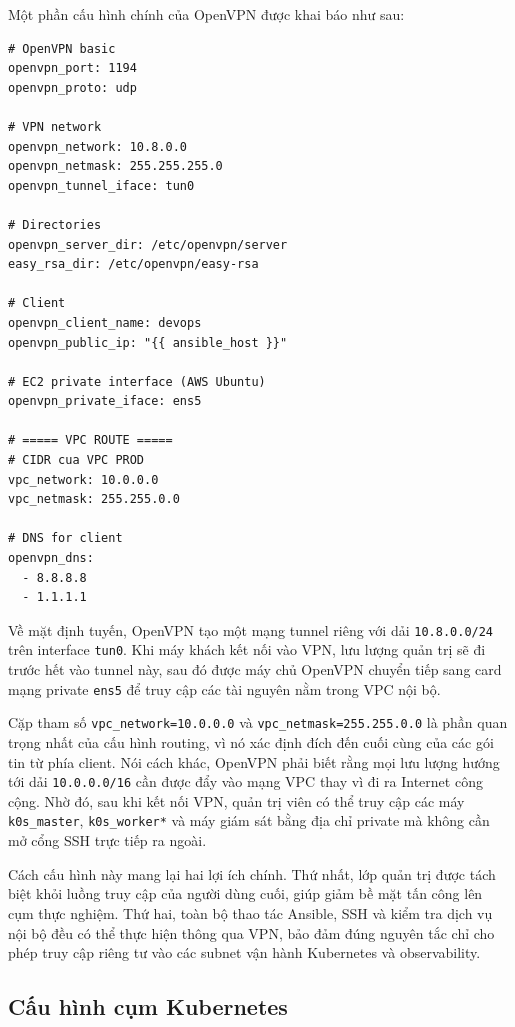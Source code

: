 Một phần cấu hình chính của OpenVPN được khai báo như sau:

\begin{lstlisting}
# OpenVPN basic
openvpn_port: 1194
openvpn_proto: udp

# VPN network
openvpn_network: 10.8.0.0
openvpn_netmask: 255.255.255.0
openvpn_tunnel_iface: tun0

# Directories
openvpn_server_dir: /etc/openvpn/server
easy_rsa_dir: /etc/openvpn/easy-rsa

# Client
openvpn_client_name: devops
openvpn_public_ip: "{{ ansible_host }}"

# EC2 private interface (AWS Ubuntu)
openvpn_private_iface: ens5

# ===== VPC ROUTE =====
# CIDR cua VPC PROD
vpc_network: 10.0.0.0
vpc_netmask: 255.255.0.0

# DNS for client
openvpn_dns:
  - 8.8.8.8
  - 1.1.1.1
\end{lstlisting}

\noindent Về mặt định tuyến, OpenVPN tạo một mạng tunnel riêng với dải \texttt{10.8.0.0/24} trên interface \texttt{tun0}. Khi máy khách kết nối vào VPN, lưu lượng quản trị sẽ đi trước hết vào tunnel này, sau đó được máy chủ OpenVPN chuyển tiếp sang card mạng private \texttt{ens5} để truy cập các tài nguyên nằm trong VPC nội bộ.

\noindent Cặp tham số \texttt{vpc\_network=10.0.0.0} và \texttt{vpc\_netmask=255.255.0.0} là phần quan trọng nhất của cấu hình routing, vì nó xác định đích đến cuối cùng của các gói tin từ phía client. Nói cách khác, OpenVPN phải biết rằng mọi lưu lượng hướng tới dải \texttt{10.0.0.0/16} cần được đẩy vào mạng VPC thay vì đi ra Internet công cộng. Nhờ đó, sau khi kết nối VPN, quản trị viên có thể truy cập các máy \texttt{k0s\_master}, \texttt{k0s\_worker*} và máy giám sát bằng địa chỉ private mà không cần mở cổng SSH trực tiếp ra ngoài.

\noindent Cách cấu hình này mang lại hai lợi ích chính. Thứ nhất, lớp quản trị được tách biệt khỏi luồng truy cập của người dùng cuối, giúp giảm bề mặt tấn công lên cụm thực nghiệm. Thứ hai, toàn bộ thao tác Ansible, SSH và kiểm tra dịch vụ nội bộ đều có thể thực hiện thông qua VPN, bảo đảm đúng nguyên tắc chỉ cho phép truy cập riêng tư vào các subnet vận hành Kubernetes và observability.

\subsection{Cấu hình cụm Kubernetes}

